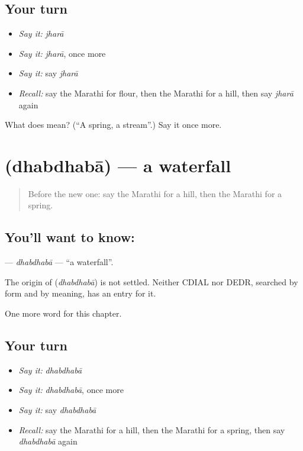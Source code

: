 \subsection*{Your turn}
\begin{itemize}
\raggedright
  \item \emph{Say it:} \emph{jharā}
  \item \emph{Say it:} \emph{jharā}, once more
  \item \emph{Say it:} say \emph{jharā}
  \item \emph{Recall:} say the Marathi for flour, then the Marathi for a hill, then say \emph{jharā} again
\end{itemize}

\begin{tcolorbox}[breakable,colback=teal!4,colframe=teal!35!black,title={Before you move on}]
What does  mean? (\textquotedblleft{}A spring, a stream\textquotedblright{}.) Say it once more.
\end{tcolorbox}
\section[\texorpdfstring{\mr{धबधबा} (dhabdhabā)}{धबधबा (dhabdhabā)}]{ (dhabdhabā) — a waterfall}

\label{lesson:MR-C139-dhabdhaba}



\begin{quote}
Before the new one: say the Marathi for a hill, then the Marathi for a spring.
\end{quote}

\subsection*{You'll want to know: }
\textbf{} — \emph{dhabdhabā} — \textquotedblleft{}a waterfall\textquotedblright{}.

\begin{cousinweb}
The origin of \textbf{} (\emph{dhabdhabā}) is not settled. Neither CDIAL nor DEDR, searched by form and by meaning, has an entry for it.
\end{cousinweb}

\begin{grammarlens}[title={What you've built}]
One more word for this chapter.
\end{grammarlens}

\subsection*{Your turn}
\begin{itemize}
\raggedright
  \item \emph{Say it:} \emph{dhabdhabā}
  \item \emph{Say it:} \emph{dhabdhabā}, once more
  \item \emph{Say it:} say \emph{dhabdhabā}
  \item \emph{Recall:} say the Marathi for a hill, then the Marathi for a spring, then say \emph{dhabdhabā} again
\end{itemize}

